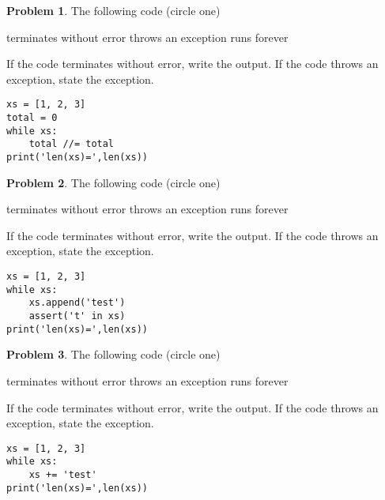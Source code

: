 \documentclass[10pt]{article}
\theoremstyle{definition}
\newtheorem{problem}{Problem}
\begin{document}
\begin{problem}
    The following code (circle one)

    \vspace{0.25in}
    \hspace{0.5in}terminates without error 
    \hspace{1in}throws an exception
    \hspace{1in}runs forever
    \vspace{0.25in}

    \noindent
    If the code terminates without error, write the output.
    If the code throws an exception, state the exception.
\end{problem}
\begin{lstlisting}
xs = [1, 2, 3]
total = 0
while xs:
    total //= total
print('len(xs)=',len(xs))
\end{lstlisting}
\vspace{1in}

\begin{problem}
    The following code (circle one)

    \vspace{0.25in}
    \hspace{0.5in}terminates without error 
    \hspace{1in}throws an exception
    \hspace{1in}runs forever
    \vspace{0.25in}

    \noindent
    If the code terminates without error, write the output.
    If the code throws an exception, state the exception.
\end{problem}
\begin{lstlisting}
xs = [1, 2, 3]
while xs:
    xs.append('test')
    assert('t' in xs)
print('len(xs)=',len(xs))
\end{lstlisting}
\vspace{1in}

\begin{problem}
    The following code (circle one)

    \vspace{0.25in}
    \hspace{0.5in}terminates without error 
    \hspace{1in}throws an exception
    \hspace{1in}runs forever
    \vspace{0.25in}

    \noindent
    If the code terminates without error, write the output.
    If the code throws an exception, state the exception.
\end{problem}
\begin{lstlisting}
xs = [1, 2, 3]
while xs:
    xs += 'test'
print('len(xs)=',len(xs))
\end{lstlisting}
\vspace{1in}
\end{document}
